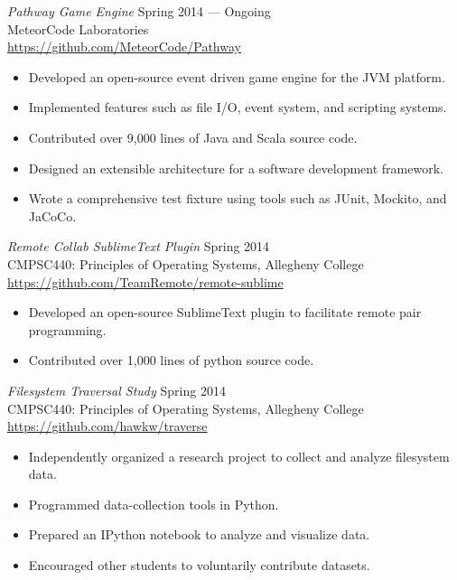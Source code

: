 \documentclass[margin]{res}
\begin{document}
\begin{resume}
        {\sl Pathway Game Engine} \hfill Spring 2014 --- Ongoing \\
                MeteorCode Laboratories \\ 
        \url{https://github.com/MeteorCode/Pathway}
        \begin{itemize} \itemsep -2pt %
        \item Developed an open-source event driven game engine for the JVM platform.
        \item Implemented features such as file I/O, event system, and scripting systems.
        \item Contributed over 9,000 lines of Java and Scala source code.
        \item Designed an extensible architecture for a software development framework.
        \item Wrote a comprehensive test fixture using tools such as JUnit, Mockito, and JaCoCo.
        \end{itemize}
        
        {\sl Remote Collab SublimeText Plugin } \hfill Spring 2014 \\
        CMPSC440: Principles of Operating Systems, Allegheny College \\
        \url{https://github.com/TeamRemote/remote-sublime}
        \begin{itemize}  \itemsep -2pt %
            \item Developed an open-source SublimeText plugin to facilitate remote pair programming.
            \item Contributed over 1,000 lines of python source code.
        \end{itemize}
        
                {\sl Filesystem Traversal Study} \hfill Spring 2014 \\ 
                CMPSC440: Principles of Operating Systems, Allegheny College \\
                \url{https://github.com/hawkw/traverse}
                 \begin{itemize} \itemsep -2pt %
                    \item Independently organized a research project to collect and analyze filesystem data.
                    \item Programmed data-collection tools in Python.
                    \item Prepared an IPython notebook to analyze and visualize data.
                    \item Encouraged other students to voluntarily contribute datasets.
                \end{itemize}


\end{resume}
\end{document}
